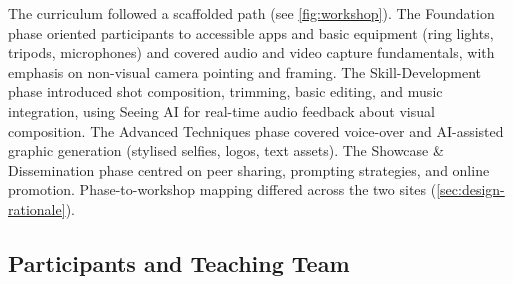 The curriculum followed a scaffolded path (see \autoref{fig:workshop}). The Foundation phase oriented participants to accessible apps and basic equipment (ring lights, tripods, microphones) and covered audio and video capture fundamentals, with emphasis on non-visual camera pointing and framing. The Skill-Development phase introduced shot composition, trimming, basic editing, and music integration, using Seeing AI for real-time audio feedback about visual composition. The Advanced Techniques phase covered voice-over and AI-assisted graphic generation (stylised selfies, logos, text assets). The Showcase \& Dissemination phase centred on peer sharing, prompting strategies, and online promotion. Phase-to-workshop mapping differed across the two sites (\autoref{sec:design-rationale}).

\subsection{Participants and Teaching Team}

